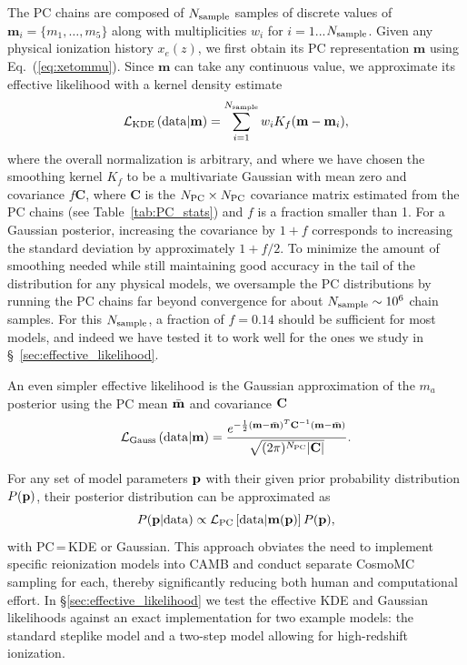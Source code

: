 \documentclass[prd,twocolumn,amsmath,amssymb,floatfix,superscriptaddress,nofootinbib]{revtex4-1}
\newcommand{\sample}{{\rm sample}}
\newcommand{\beq}{\begin{equation}}
\newcommand{\eeq}{\end{equation}}
\begin{document}
The PC chains are composed of $N_{\rm sample}$ samples of discrete values of $\mathbf{m}_i = \{m_1, \ldots, m_5\}$ along with multiplicities $w_i$ for $i = 1$...$N_{\rm sample}$. Given any physical ionization history $x_e(z)$, we first obtain its PC representation $\mathbf{m}$ using Eq.~(\ref{eq:xetommu}). Since $\mathbf{m}$ can take any continuous value, we approximate its effective likelihood with a kernel density estimate
\beq
{\cal L}_{\rm KDE}\left({\rm data}|\mathbf{m} \right)  = \sum_{i = 1}^{N_{\rm sample}} w_i K_f(\mathbf{m}-\mathbf{m}_i),
\eeq
where the overall normalization is arbitrary, and where we have chosen the smoothing kernel $K_f$ to be a  multivariate Gaussian with mean zero and covariance $f\mathbf{C}$, where $\mathbf{C}$ is the $N_{\rm PC} \times N_{\rm PC}$ covariance matrix estimated from the PC chains (see Table~\ref{tab:PC_stats}) and $f$ is a fraction smaller than 1.
For a Gaussian posterior, increasing the covariance by $1+f$ corresponds to increasing the standard deviation by approximately $1+f/2$. To minimize the amount of smoothing needed while still maintaining good accuracy in the tail of the distribution for any physical models, we oversample the PC distributions by running the PC chains far beyond convergence for about $N_{\sample} \sim 10^6$ chain samples. 
For this $N_{\sample}$, a fraction of $f = 0.14$ should be sufficient for most models, and indeed we have tested it to work well for the ones we study in \S~\ref{sec:effective_likelihood}.

An even simpler effective likelihood is the Gaussian approximation of the $m_a$ posterior using the PC mean $\bar{\bf m}$ and covariance $\bf C$
%
\begin{equation}
 {\cal L}_{\rm Gauss}\left({\rm data}|\mathbf{m} \right) = \frac{ e^{-\frac{1}{2} ({\bf m}-\bar{\bf m})^T {\bf C}^{-1} ({\bf m}-\bar{\bf m}) } }{\sqrt{(2\pi)^{N_{\rm PC}} | \mathbf{C}| }}.
 \label{eq:gaussian}
 \end{equation}
%

For any set of model parameters ${\bf p}$ with their given prior probability distribution
$P({\bf p})$, their posterior distribution can be approximated as 
\begin{equation}
P({\bf p}| {\rm data}) \propto {\cal L}_{\rm PC}\left[ {\rm data}|\mathbf{m}(\bf p) \right] P(\bf p),
\end{equation}
with PC\,=\,KDE or Gaussian.
This approach obviates the need to implement specific reionization models into CAMB and conduct separate CosmoMC sampling for each, thereby significantly reducing both human and computational effort.
In \S\ref{sec:effective_likelihood} we test the effective KDE and Gaussian likelihoods against an exact implementation
for two example models: the standard steplike model and a two-step model allowing for high-redshift ionization.
\end{document}
